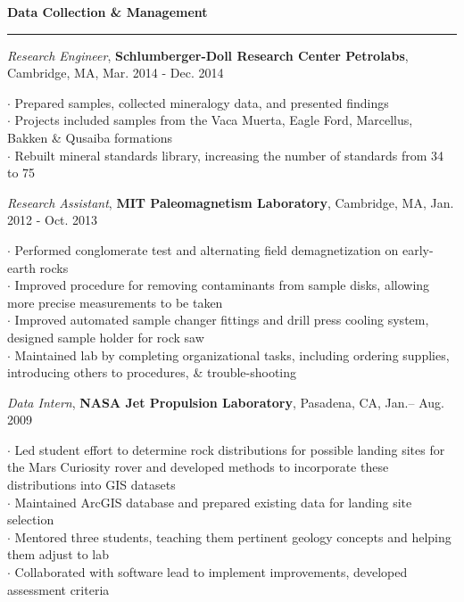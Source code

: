 \documentclass[11pt]{article}
\begin{document}
\vspace*{0.25 mm}
\textbf{Data Collection \& Management}
\smallskip
\hrule
\emph{Research Engineer}, \textbf {Schlumberger-Doll Research Center Petrolabs}, Cambridge, MA, Mar. 2014 - Dec. 2014 \\ 
\begin{small}$\cdot$ {Prepared samples, collected mineralogy data, and presented findings}\\ 
$\cdot$ {Projects included samples from the Vaca Muerta, Eagle Ford, Marcellus, Bakken \& Qusaiba  formations}\\
$\cdot$ {Rebuilt mineral standards library, increasing the number of standards from 34 to 75}\end{small} 

\smallskip
\emph {Research Assistant}, \textbf {MIT Paleomagnetism Laboratory}, Cambridge, MA, Jan. 2012 - Oct. 2013 \\ 
\begin{small}$\cdot$ {Performed conglomerate test and alternating field demagnetization on early-earth rocks} \\ 
$\cdot$ {Improved procedure for removing contaminants from sample disks, allowing more precise measurements to be taken} \\
$\cdot$ {Improved automated sample changer fittings and drill press cooling system, designed sample holder for rock saw} \\
$\cdot$ {Maintained lab by completing organizational tasks, including ordering supplies, introducing others to procedures, \& trouble-shooting}\end{small}

\smallskip
\emph{Data Intern}, \textbf{NASA Jet Propulsion Laboratory}, Pasadena, CA, Jan.-- Aug. 2009 \\
\begin{small}$\cdot$ {Led student effort to determine rock distributions for possible landing sites for the Mars Curiosity rover and developed methods to incorporate \hspace*{1 mm}these distributions into GIS datasets }\\ 
$\cdot$ {Maintained ArcGIS  database and prepared existing data for landing site selection } \\
$\cdot$ {Mentored three students, teaching them pertinent geology concepts and helping them adjust to lab }\\
$\cdot$ {Collaborated with software lead to implement improvements, developed assessment criteria}\end{small} 
\end{document}
